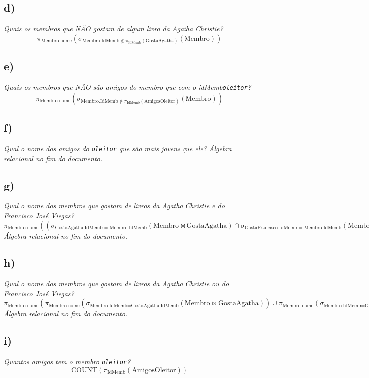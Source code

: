 \documentclass {report}
\begin{document}
\subsection{d)}
\textit{Quais os membros que NÃO gostam de algum livro da Agatha Christie?}
\[
\pi_{\text{Membro.nome}}\left(\sigma_{\text{Membro.IdMemb} \notin \pi_{\text{IdMemb}}(\text{GostaAgatha})}(\text{Membro})\right)
\]

\subsection{e)}
\textit{Quais os membros que NÃO são amigos do membro que com o idMemb\texttt{oleitor}?}
\[
\pi_{\text{Membro.nome}}\left(\sigma_{\text{Membro.IdMemb} \notin \pi_{\text{IdMemb}}(\text{AmigosOleitor})}(\text{Membro})\right)
\]

\subsection{f)}
\textit{Qual o nome dos amigos do \texttt{oleitor} que são mais jovens que ele?}
\textit{Álgebra relacional no fim do documento.}

\subsection{g)}
\textit{Qual o nome dos membros que gostam de livros da Agatha Christie e do Francisco José Viegas?}
\[
\pi_{\text{Membro.nome}}\left((\sigma_{\text{GostaAgatha.IdMemb = Membro.IdMemb}}(\text{Membro} \bowtie \text{GostaAgatha}) \cap \sigma_{\text{GostaFrancisco.IdMemb = Membro.IdMemb}}(\text{Membro} \bowtie \text{GostaFrancisco}))\right) \bowtie_{\text{Membro.nome}} \text{Membro}
\]
\textit{Álgebra relacional no fim do documento.}
%
\subsection{h)}
\textit{Qual o nome dos membros que gostam de livros da Agatha Christie ou do Francisco José Viegas?}
\[
\pi_{\text{Membro.nome}}\left(\pi_{\text{Membro.nome}}(\sigma_{\text{Membro.IdMemb} = \text{GostaAgatha.IdMemb}}(\text{Membro} \bowtie \text{GostaAgatha})) \cup \pi_{\text{Membro.nome}}(\sigma_{\text{Membro.IdMemb} = \text{GostaFrancisco.IdMemb}}(\text{Membro} \bowtie \text{GostaFrancisco}))\right)
\]
\textit{Álgebra relacional no fim do documento.}

\subsection{i)}
\textit{Quantos amigos tem o membro \texttt{oleitor}?}
\[
\text{COUNT}(\pi_{\text{IdMemb}}(\text{AmigosOleitor}))
\]
\end{document}
